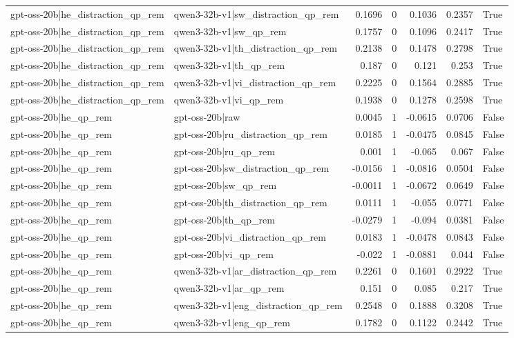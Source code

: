 \begin{table}
\begin{tabular}{l l r r r r l}
gpt-oss-20b|he_distraction_qp_rem & qwen3-32b-v1|sw_distraction_qp_rem & 0.1696 & 0 & 0.1036 & 0.2357 & True \\
gpt-oss-20b|he_distraction_qp_rem & qwen3-32b-v1|sw_qp_rem & 0.1757 & 0 & 0.1096 & 0.2417 & True \\
gpt-oss-20b|he_distraction_qp_rem & qwen3-32b-v1|th_distraction_qp_rem & 0.2138 & 0 & 0.1478 & 0.2798 & True \\
gpt-oss-20b|he_distraction_qp_rem & qwen3-32b-v1|th_qp_rem & 0.187 & 0 & 0.121 & 0.253 & True \\
gpt-oss-20b|he_distraction_qp_rem & qwen3-32b-v1|vi_distraction_qp_rem & 0.2225 & 0 & 0.1564 & 0.2885 & True \\
gpt-oss-20b|he_distraction_qp_rem & qwen3-32b-v1|vi_qp_rem & 0.1938 & 0 & 0.1278 & 0.2598 & True \\
gpt-oss-20b|he_qp_rem & gpt-oss-20b|raw & 0.0045 & 1 & -0.0615 & 0.0706 & False \\
gpt-oss-20b|he_qp_rem & gpt-oss-20b|ru_distraction_qp_rem & 0.0185 & 1 & -0.0475 & 0.0845 & False \\
gpt-oss-20b|he_qp_rem & gpt-oss-20b|ru_qp_rem & 0.001 & 1 & -0.065 & 0.067 & False \\
gpt-oss-20b|he_qp_rem & gpt-oss-20b|sw_distraction_qp_rem & -0.0156 & 1 & -0.0816 & 0.0504 & False \\
gpt-oss-20b|he_qp_rem & gpt-oss-20b|sw_qp_rem & -0.0011 & 1 & -0.0672 & 0.0649 & False \\
gpt-oss-20b|he_qp_rem & gpt-oss-20b|th_distraction_qp_rem & 0.0111 & 1 & -0.055 & 0.0771 & False \\
gpt-oss-20b|he_qp_rem & gpt-oss-20b|th_qp_rem & -0.0279 & 1 & -0.094 & 0.0381 & False \\
gpt-oss-20b|he_qp_rem & gpt-oss-20b|vi_distraction_qp_rem & 0.0183 & 1 & -0.0478 & 0.0843 & False \\
gpt-oss-20b|he_qp_rem & gpt-oss-20b|vi_qp_rem & -0.022 & 1 & -0.0881 & 0.044 & False \\
gpt-oss-20b|he_qp_rem & qwen3-32b-v1|ar_distraction_qp_rem & 0.2261 & 0 & 0.1601 & 0.2922 & True \\
gpt-oss-20b|he_qp_rem & qwen3-32b-v1|ar_qp_rem & 0.151 & 0 & 0.085 & 0.217 & True \\
gpt-oss-20b|he_qp_rem & qwen3-32b-v1|eng_distraction_qp_rem & 0.2548 & 0 & 0.1888 & 0.3208 & True \\
gpt-oss-20b|he_qp_rem & qwen3-32b-v1|eng_qp_rem & 0.1782 & 0 & 0.1122 & 0.2442 & True \\

\end{tabular}
\end{table}
